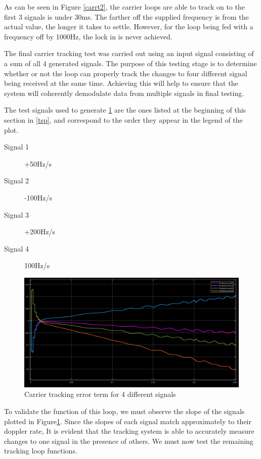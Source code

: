 \documentclass[11pt]{article}
\numberwithin{equation}{subsection}
\begin{document}
	As can be seen in Figure \ref{carrt2}, the carrier loops are able to track on to the first 3 signals is under 30ms. The farther off the supplied frequency is from the actual value, the longer it takes to settle. However, for the loop being fed with a frequency off by 1000Hz, the lock in is never achieved. 
	
	The final carrier tracking test was carried out using an input signal consisting of a sum of all 4 generated signals. The purpose of this testing stage is to determine whether or not the loop can properly track the changes to four different signal being received at the same time. Achieving this will help to ensure that the system will coherently demodulate data from multiple signals in final testing.
	
	The test signals used to generate \ref{carrt3} are the ones listed at the beginning of this section in \ref{tsp}, and correspond to the order they appear in the legend of the plot.
	
	\begin{description}
		\item[Signal 1]{ +50Hz/s}
		
		\item[Signal 2]{ -100Hz/s}
		
		\item[Signal 3]{+200Hz/s}
		
		\item[Signal 4]{100Hz/s}
	\end{description}
	
	\begin{figure}
		\centering
		\includegraphics[width=\textwidth]{Carrier_Tracking_Test_3}
		\caption{Carrier tracking error term for 4 different signals}
		\label{carrt3}
	\end{figure}
	
	To validate the function of this loop, we must observe the slope of the signals plotted in Figure\ref{carrt3}. Since the slopes of each signal match approximately to their doppler rate, It is evident that the tracking system is able to accurately measure changes to one signal in the presence of others. We must now test the remaining tracking loop functions.
\end{document}
